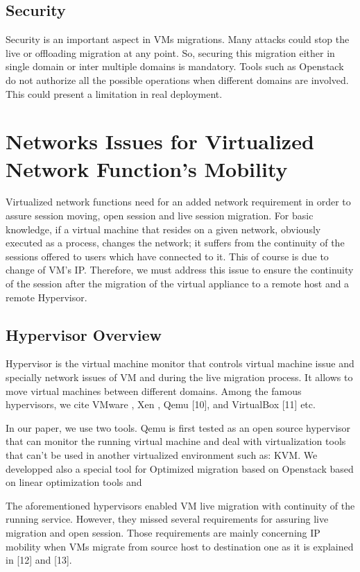 \documentclass[letterpaper,conference]{IEEEtran}
\begin{document}
\subsection{Security}

Security is an important aspect in VMs migrations. Many attacks could stop the live or offloading migration at any point. So, securing this migration either in single domain or inter multiple domains is mandatory. Tools such as Openstack do not authorize all the possible operations when different domains are involved. This could present a limitation in real deployment.

\section{Networks Issues for Virtualized Network
Function’s Mobility}

Virtualized network functions need for an added network requirement in order to assure session moving, open session and live session migration. For basic knowledge, if a virtual machine that resides on a given network, obviously executed as a process, changes the network; it suffers from the
continuity of the sessions offered to users which have
connected to it. This of course is due to change of VM’s IP. Therefore, we must address this issue to ensure the continuity of the session after the migration of the virtual appliance to a remote host and a remote Hypervisor.

\subsection{Hypervisor Overview}

Hypervisor is the virtual machine monitor that controls virtual machine issue and specially network issues of VM and during the live migration process. It allows to move virtual machines between different domains. Among the famous hypervisors, we cite VMware \cite{[8]}, Xen \cite{[9]}, Qemu [10], and VirtualBox [11] etc.

In our paper, we use two tools. Qemu is first tested as an open source hypervisor
that can monitor the running virtual machine and deal with virtualization tools that can’t be used in another virtualized environment such as: KVM. We developped also a special tool for Optimized migration based on Openstack \cite{[21]} based on linear optimization tools \cite{[19]} and \cite{[20]}

The aforementioned hypervisors enabled VM live migration with continuity of the running service. However, they missed several requirements for assuring live migration and open session. Those requirements are mainly concerning IP mobility when VMs migrate from source host to destination one as it is explained in [12] and [13].
\end{document}
